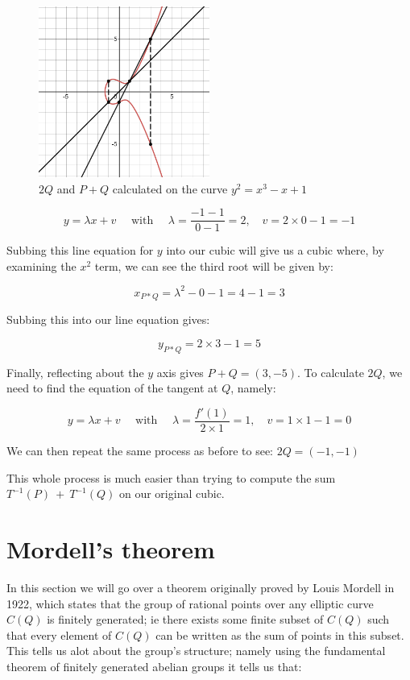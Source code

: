 \documentclass{article}
\begin{document}
\begin{figure}
\centering
\includegraphics[width=0.5\textwidth]{desmos-graph (3).png}
\caption{\label{fig:into curve} $2Q$ and $P+Q$ calculated on the curve $y^{2} = x^{3} - x  + 1$}
\end{figure}


\[y = \lambda x + v \quad \text{ with } \quad \lambda = \frac{-1 - 1}{0 - 1} = 2, \quad v = 2\times 0 -1 = -1\]

Subbing this line equation for $y$ into our cubic will give us a cubic where, by examining the $x^2$ term, we can see the third root will be given by:

\[x_{P*Q} = \lambda^2 - 0 - 1 = 4 - 1 = 3\]

Subbing this into our line equation gives:

\[y_{P*Q} = 2 \times 3 - 1 = 5\]

Finally, reflecting about the $y$ axis gives $P + Q = (3, -5)$. To calculate $2Q$, we need to find the equation of the tangent at $Q$, namely:

\[y = \lambda x + v \quad \text{ with } \quad \lambda = \frac{f'(1)}{2 \times 1} = 1, \quad v = 1 \times 1 - 1 = 0\]

We can then repeat the same process as before to see: $2Q = (-1, -1)$

This whole process is much easier than trying to compute the sum $T^{-1}(P) \ + \ T^{-1}(Q)$ on our original cubic.

\newpage


\section{Mordell's theorem}

In this section we will go over a theorem originally proved by Louis Mordell in 1922, which states that the group of rational points over any elliptic curve $C(Q)$ is finitely generated; ie there exists some finite subset of $C(Q)$ such that every element of $C(Q)$ can be written as the sum of points in this subset. This tells us alot about the group's structure; namely using the fundamental theorem of finitely generated abelian groups it tells us that:
\end{document}

